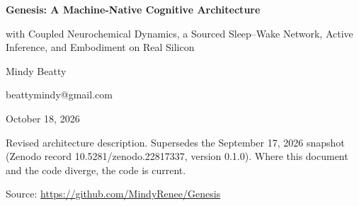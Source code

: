 \documentclass[11pt]{article}
\begin{document}
\begin{titlepage}
  \centering
  \vspace*{2.5cm}
  {\LARGE\bfseries Genesis: A Machine-Native Cognitive Architecture\par}
  \vspace{0.8cm}
  {\large with Coupled Neurochemical Dynamics, a Sourced Sleep--Wake
  Network, Active Inference, and Embodiment on Real Silicon\par}
  \vspace{1.6cm}
  {\large Mindy Beatty\par}
  \vspace{0.3cm}
  {\normalsize beattymindy@gmail.com\par}
  \vspace{1.2cm}
  {\normalsize October 18, 2026\par}
  \vspace{0.6cm}
  {\small Revised architecture description. Supersedes the September 17,
  2026 snapshot (Zenodo record 10.5281/zenodo.22817337, version 0.1.0).
  Where this document and the code diverge, the code is current.\par}
  \vfill
  {\small Source: \url{https://github.com/MindyRenee/Genesis}\par}
\end{titlepage}
\end{document}
